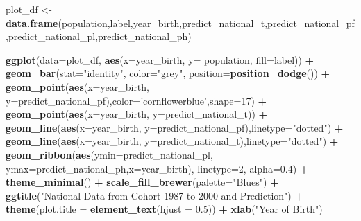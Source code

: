 \documentclass[]{article}
\newenvironment{Shaded}{\begin{snugshade}}{\end{snugshade}}
\newcommand{\KeywordTok}[1]{\textcolor[rgb]{0.13,0.29,0.53}{\textbf{#1}}}
\newcommand{\DataTypeTok}[1]{\textcolor[rgb]{0.13,0.29,0.53}{#1}}
\newcommand{\DecValTok}[1]{\textcolor[rgb]{0.00,0.00,0.81}{#1}}
\newcommand{\FloatTok}[1]{\textcolor[rgb]{0.00,0.00,0.81}{#1}}
\newcommand{\StringTok}[1]{\textcolor[rgb]{0.31,0.60,0.02}{#1}}
\newcommand{\OperatorTok}[1]{\textcolor[rgb]{0.81,0.36,0.00}{\textbf{#1}}}
\newcommand{\NormalTok}[1]{#1}
\begin{document}
\begin{Shaded}
\begin{Highlighting}[]
\NormalTok{plot_df <-}\StringTok{ }\KeywordTok{data.frame}\NormalTok{(population,label,year_birth,predict_national_t,predict_national_pf,predict_national_pl,predict_national_ph)}

\KeywordTok{ggplot}\NormalTok{(}\DataTypeTok{data=}\NormalTok{plot_df, }\KeywordTok{aes}\NormalTok{(}\DataTypeTok{x=}\NormalTok{year_birth, }\DataTypeTok{y=}\NormalTok{ population, }\DataTypeTok{fill=}\NormalTok{label)) }\OperatorTok{+}
\StringTok{  }\KeywordTok{geom_bar}\NormalTok{(}\DataTypeTok{stat=}\StringTok{"identity"}\NormalTok{, }\DataTypeTok{color=}\StringTok{"grey"}\NormalTok{, }\DataTypeTok{position=}\KeywordTok{position_dodge}\NormalTok{()) }\OperatorTok{+}
\StringTok{  }\KeywordTok{geom_point}\NormalTok{(}\KeywordTok{aes}\NormalTok{(}\DataTypeTok{x=}\NormalTok{year_birth, }\DataTypeTok{y=}\NormalTok{predict_national_pf),}\DataTypeTok{color=}\StringTok{'cornflowerblue'}\NormalTok{,}\DataTypeTok{shape=}\DecValTok{17}\NormalTok{) }\OperatorTok{+}
\StringTok{  }\KeywordTok{geom_point}\NormalTok{(}\KeywordTok{aes}\NormalTok{(}\DataTypeTok{x=}\NormalTok{year_birth, }\DataTypeTok{y=}\NormalTok{predict_national_t)) }\OperatorTok{+}
\StringTok{  }\KeywordTok{geom_line}\NormalTok{(}\KeywordTok{aes}\NormalTok{(}\DataTypeTok{x=}\NormalTok{year_birth, }\DataTypeTok{y=}\NormalTok{predict_national_pf),}\DataTypeTok{linetype=}\StringTok{"dotted"}\NormalTok{) }\OperatorTok{+}
\StringTok{  }\KeywordTok{geom_line}\NormalTok{(}\KeywordTok{aes}\NormalTok{(}\DataTypeTok{x=}\NormalTok{year_birth, }\DataTypeTok{y=}\NormalTok{predict_national_t),}\DataTypeTok{linetype=}\StringTok{"dotted"}\NormalTok{) }\OperatorTok{+}
\StringTok{  }\KeywordTok{geom_ribbon}\NormalTok{(}\KeywordTok{aes}\NormalTok{(}\DataTypeTok{ymin=}\NormalTok{predict_national_pl, }\DataTypeTok{ymax=}\NormalTok{predict_national_ph,}\DataTypeTok{x=}\NormalTok{year_birth), }\DataTypeTok{linetype=}\DecValTok{2}\NormalTok{, }\DataTypeTok{alpha=}\FloatTok{0.4}\NormalTok{) }\OperatorTok{+}
\StringTok{    }\KeywordTok{theme_minimal}\NormalTok{() }\OperatorTok{+}
\StringTok{    }\KeywordTok{scale_fill_brewer}\NormalTok{(}\DataTypeTok{palette=}\StringTok{"Blues"}\NormalTok{) }\OperatorTok{+}
\StringTok{    }\KeywordTok{ggtitle}\NormalTok{(}\StringTok{"National Data from Cohort 1987 to 2000 and Prediction"}\NormalTok{) }\OperatorTok{+}
\StringTok{    }\KeywordTok{theme}\NormalTok{(}\DataTypeTok{plot.title =} \KeywordTok{element_text}\NormalTok{(}\DataTypeTok{hjust =} \FloatTok{0.5}\NormalTok{)) }\OperatorTok{+}
\StringTok{    }\KeywordTok{xlab}\NormalTok{(}\StringTok{"Year of Birth"}\NormalTok{)}
\end{Highlighting}
\end{Shaded}
\end{document}

